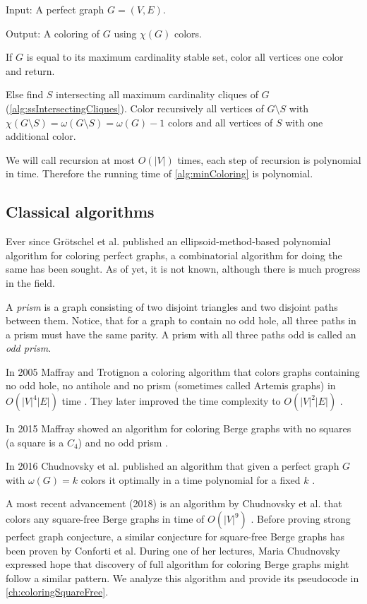 \begin{alg}
  \label{alg:minColoring}
  Input: A perfect graph $G = (V, E)$.

  \noindent Output: A coloring of $G$ using $\chi(G)$ colors.
\end{alg}
\begin{algtext}
  If $G$ is equal to its maximum cardinality stable set, color all vertices one color and return.

  Else find $S$ intersecting all maximum cardinality cliques of $G$ (\cref{alg:ssIntersectingCliques}). Color recursively all vertices of $G \setminus S$ with $\chi(G \setminus S) = \omega(G \setminus S) = \omega(G) -1$ colors and all vertices of $S$ with one additional color.
\end{algtext}

We will call recursion at most $O(|V|)$ times, each step of recursion is polynomial in time. Therefore the running time of \cref{alg:minColoring} is polynomial.

\subsection{Classical algorithms}
\label{sec:classicalColoring}

Ever since Grötschel et al. published an ellipsoid-method-based polynomial algorithm for coloring perfect graphs, a combinatorial algorithm for doing the same has been sought. As of yet, it is not known, although there is much progress in the field.

A \emph{prism} is a graph consisting of two disjoint triangles and two disjoint paths between them. Notice, that for a graph to contain no odd hole, all three paths in a prism must have the same parity. A prism with all three paths odd is called an \emph{odd prism}.

In 2005 Maffray and Trotignon a coloring algorithm that colors graphs containing no odd hole, no antihole and no prism (sometimes called Artemis graphs) in $O(|V|^4|E|)$ time \cite{Maffray2006}. They later improved the time complexity to $O(|V|^2|E|)$ \cite{Lvque2009}.

In 2015 Maffray showed an algorithm for coloring Berge graphs with no squares (a square is a $C_4$) and no odd prism \cite{Maff2015}.

In 2016 Chudnovsky et al. published an algorithm that given a perfect graph $G$ with $\omega(G) = k$ colors it optimally in a time polynomial for a fixed $k$ \cite{Chudnovsky2017}.

A most recent advancement (2018) is an algorithm by Chudnovsky et al. that colors any square-free Berge graphs in time of $O(|V|^9)$ \cite{Chudnovsky2019}. Before proving strong perfect graph conjecture, a similar conjecture for square-free Berge graphs has been proven by Conforti et al. \cite{Conforti2004} During one of her lectures, Maria Chudnovsky expressed hope that discovery of full algorithm for coloring Berge graphs might follow a similar pattern. We analyze this algorithm and provide its pseudocode in \cref{ch:coloringSquareFree}.